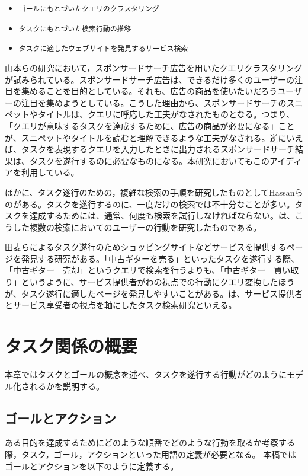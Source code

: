 \documentclass[submit,techreq]{ipsj}
\def\|{\verb|}
\begin{document}
\begin{itemize}
\item \|ゴールにもとづいたクエリのクラスタリング|
\item \|タスクにもとづいた検索行動の推移|
\item \|タスクに適したウェブサイトを発見するサービス検索|
\end{itemize}

山本らの研究\cite{yamatake}において，スポンサードサーチ広告を用いたクエリクラスタリングが試みられている。スポンサードサーチ広告は、できるだけ多くのユーザーの注目を集めることを目的としている。それも、広告の商品を使いたいだろうユーザーの注目を集めようとしている。こうした理由から、スポンサードサーチのスニペットやタイトルは、クエリに呼応した工夫がなされたものとなる。つまり、「クエリが意味するタスクを達成するために、広告の商品が必要になる」ことが、スニペットやタイトルを読むと理解できるような工夫がなされる。逆にいえば、タスクを表現するクエリを入力したときに出力されるスポンサードサーチ結果は、タスクを遂行するのに必要なものになる。本研究においてもこのアイディアを利用している。

ほかに、タスク遂行のための，複雑な検索の手順を研究したものとしてHassanらの\cite{hassan}がある。タスクを遂行するのに、一度だけの検索では不十分なことが多い。タスクを達成するためには、通常、何度も検索を試行しなければならない。\cite{hassan}は、こうした複数の検索においてのユーザーの行動を研究したものである。


田麦らによるタスク遂行のためショッピングサイトなどサービスを提供するページを発見する研究\cite{tamugi}がある。「中古ギターを売る」といったタスクを遂行する際、「中古ギター　売却」というクエリで検索を行うよりも、「中古ギター　買い取り」というように、サービス提供者がわの視点での行動にクエリ変換したほうが、タスク遂行に適したページを発見しやすいことがある。\cite{tamugi}は、サービス提供者とサービス享受者の視点を軸にしたタスク検索研究といえる。


\section{タスク関係の概要}
本章ではタスクとゴールの概念を述べ、タスクを遂行する行動がどのようにモデル化されるかを説明する。


\subsection{ゴールとアクション}
ある目的を達成するためにどのような順番でどのような行動を取るか考察する際，タスク，ゴール，アクションといった用語の定義が必要となる。
本稿ではゴールとアクションを以下のように定義する。
\end{document}
